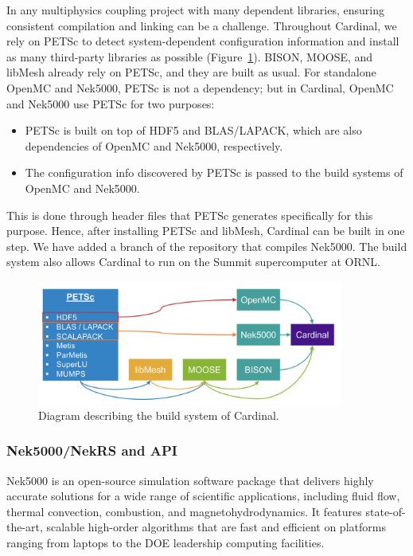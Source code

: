 In any multiphysics coupling project with many dependent libraries, ensuring consistent compilation and linking can be a challenge. Throughout Cardinal, we rely on PETSc to detect system-dependent configuration information and install as many third-party libraries as possible (Figure~\ref{f:build}). BISON, MOOSE, and libMesh already rely on PETSc, and they are built as usual. For standalone OpenMC and
Nek5000, PETSc is not a dependency; but in Cardinal, OpenMC and Nek5000 use PETSc for two purposes:
\begin{itemize}
\item PETSc is built on top of HDF5 and BLAS/LAPACK, which are also dependencies of OpenMC and Nek5000, respectively.
\item The configuration info discovered by PETSc is passed to the build systems of OpenMC and Nek5000.
\end{itemize}
This is done through header files that PETSc generates specifically for this purpose. Hence, after installing PETSc and libMesh, Cardinal can be built in one step.
We have added a branch of the repository that compiles Nek5000. The build system also allows Cardinal to run on the Summit supercomputer at ORNL.
\begin{figure}[!h]
\centering
\includegraphics[clip=true,width=0.9\textwidth]{Figures/build}
\caption{Diagram describing the build system of Cardinal.}
\label{f:build}
\end{figure}

\subsubsection{Nek5000/NekRS and API}

Nek5000 \cite{fischer2015nek5000} is an open-source simulation software package
that delivers highly accurate solutions for a wide range of scientific
applications, including fluid flow, thermal convection, combustion, and
magnetohydrodynamics. It features state-of-the-art, scalable high-order
algorithms that are fast and efficient on platforms ranging from laptops to the
DOE leadership computing facilities.

